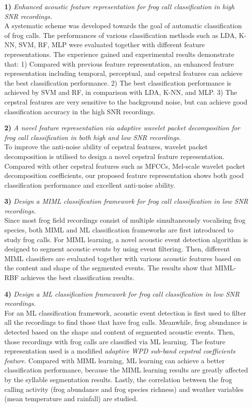 	
\textbf{1)} \textit{Enhanced acoustic feature representation for frog call classification in high SNR recordings.} 
\\
A systematic scheme was developed towards the goal of automatic classification of frog calls. The performances of various classification methods such as LDA, K-NN, SVM, RF, MLP were evaluated together with different feature representations. The experience gained and experimental results demonstrate that: 1) Compared with previous feature representation, an enhanced feature representation including temporal, perceptual, and cepstral features can achieve the best classification performance. 2) The best classification performance is achieved by SVM and RF, in comparison with LDA, K-NN, and MLP. 3) The cepstral features are very sensitive to the background noise, but can achieve good classification accuracy in the high SNR recordings. 

\textbf{2)} \textit{A novel feature representation via adaptive wavelet packet decomposition for frog call classification in both high and low SNR recordings.}
\\
To improve the anti-noise ability of cepstral features, wavelet packet decomposition is utilised to design a novel cepstral feature representation. Compared with other cepstral features such as MFCCs, Mel-scale wavelet packet decomposition coefficients, our proposed feature representation shows both good classification performance and excellent anti-noise ability. 



\textbf{3)}  \textit{Design a MIML classification framework for frog call classification in low SNR recordings.} 
\\
Since most frog field recordings consist of multiple simultaneously vocalising frog species, both MIML and ML classification frameworks are first introduced to study frog calls. For MIML learning, a novel acoustic event detection algorithm is designed to segment acoustic events by using event filtering. Then, different MIML classifiers are evaluated together with various acoustic features based on the content and shape of the segmented events. The results show that MIML-RBF achieves the best classification results. 


\textbf{4)}  \textit{Design a ML classification framework for frog call classification in low SNR recordings.} 
\\
For an ML classification framework, acoustic event detection is first used to filter all the recordings to find those that have frog calls. Meanwhile, frog abundance is detected based on the shape and content of segmented acoustic events. Then, those recordings with frog calls are classified via ML learning. The feature representation used is a modified \textit{adaptive WPD sub-band cepstral coefficients feature}. Compared with MIML learning, ML learning can achieve a better classification performance, because the MIML learning results are greatly affected by the syllable segmentation results. Lastly, the correlation between the frog calling activity (frog abundance and frog species richness) and weather variables (mean temperature and rainfall) are studied.

